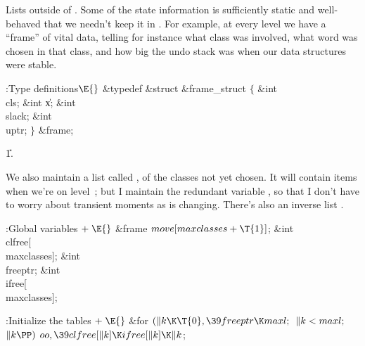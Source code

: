 Lists outside of . Some of the
state information is sufficiently
static and well-behaved that we needn't keep it in . For example,
at every level we have a ``frame'' of vital data, telling for instance
what class was involved, what word was chosen in that class, and how big
the undo stack was when our data structures were stable.

\Y\B\4:Type definitions\X${}\E{}$\6
\&{typedef} \&{struct} \&{frame\_struct} ${}\{{}$\1\6
\&{int} \\{cls};\6
\&{int} \|x;\6
\&{int} \\{slack};\6
\&{int} \\{uptr};\2\6
${}\}{}$ \&{frame};\par
\U1.\fi

We also maintain a list called , of
the classes not yet chosen.
It will contain  items when we're on level~; but I
maintain the
redundant variable , so that I don't have to worry about
transient moments as  is changing. There's also
an inverse list .

\Y\B\4:Global variables\X${}\mathrel+\E{}$\6
\&{frame} ${}\\{move}[\\{maxclasses}+\T{1}]{}$;\6
\&{int} \\{clfree}[\\{maxclasses}];\6
\&{int} \\{freeptr};\6
\&{int} \\{ifree}[\\{maxclasses}];%
\par
\fi

\B{}:Initialize the tables\X${}\mathrel+\E{}$\6
\&{for} ${}(\|k\K\T{0},\39\\{freeptr}\K\\{maxl};{}$ ${}\|k<\\{maxl};{}$ ${}\|k%
\PP){}$\1\5
${}\\{oo},\39\\{clfree}[\|k]\K\\{ifree}[\|k]\K\|k{}$;\2\par
\fi

